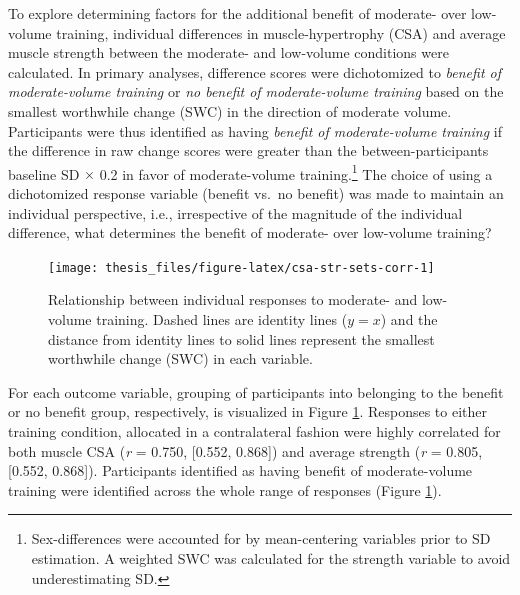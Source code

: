 \documentclass[twoside,10pt]{gihclass} %
\begin{document}
To explore determining factors for the additional benefit of moderate- over low-volume training, individual differences in muscle-hypertrophy (CSA) and average muscle strength between the moderate- and low-volume conditions were calculated. In primary analyses, difference scores were dichotomized to \emph{benefit of moderate-volume training} or \emph{no benefit of moderate-volume training} based on the smallest worthwhile change (SWC) in the direction of moderate volume. Participants were thus identified as having \emph{benefit of moderate-volume training} if the difference in raw change scores were greater than the between-participants baseline SD \(\times\) 0.2 in favor of moderate-volume training.\footnote{Sex-differences were accounted for by mean-centering variables prior to SD estimation. A weighted SWC was calculated for the strength variable to avoid underestimating SD.}
The choice of using a dichotomized response variable (benefit vs.~no benefit) was made to maintain an individual perspective, i.e., irrespective of the magnitude of the individual difference, what determines the benefit of moderate- over low-volume training?
\begin{figure}

{\centering \texttt{[image: thesis\_files/figure-latex/csa-str-sets-corr-1]} 

}

\caption[Relationship between individual responses to moderate- and low-volume training]{Relationship between individual responses to moderate- and low-volume training. Dashed lines are identity lines ($y = x$) and the distance from identity lines to solid lines represent the smallest worthwhile change (SWC) in each variable.}\label{fig:csa-str-sets-corr}
\end{figure}
For each outcome variable, grouping of participants into belonging to the benefit or no benefit group, respectively, is visualized in Figure \ref{fig:csa-str-sets-corr}. Responses to either training condition, allocated in a contralateral fashion were highly correlated for both muscle CSA (\emph{r} = 0.750, {[}0.552, 0.868{]}) and average strength (\emph{r} = 0.805, {[}0.552, 0.868{]}). Participants identified as having benefit of moderate-volume training were identified across the whole range of responses (Figure \ref{fig:csa-str-sets-corr}).
\end{document}

